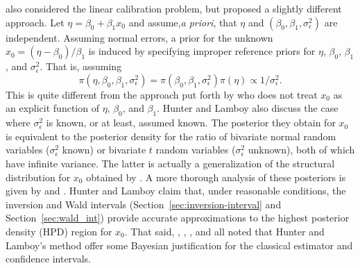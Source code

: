\documentclass[cmfont,usenames,dvipsnames,leqno]{afit-etd}\usepackage[]{graphicx}\usepackage[]{color}
\begin{document}
\citet{hunter_bayesian_1981} also considered the linear calibration problem, but proposed a slightly different approach. Let $\eta = \beta_0 + \beta_1 x_0$ and assume,\textit{a priori}, that $\eta$ and $(\beta_0, \beta_1, \sigma_\epsilon^2)$ are independent. Assuming normal errors, a prior for the unknown $x_0 = (\eta - \beta_0)/\beta_1$ is induced by specifying improper reference priors for $\eta$, $\beta_0$, $\beta_1$, and $\sigma_\epsilon^2$. That is, assuming 
\begin{equation*}
  \pi\left(\eta, \beta_0, \beta_1, \sigma_\epsilon^2\right) = \pi\left(\beta_0, \beta_1, \sigma_\epsilon^2\right) \pi\left(\eta\right) \propto 1/\sigma_\epsilon^2. 
\end{equation*}
This is quite different from the approach put forth by \citet{hoadley_bayesian_1970} who does not treat $x_0$ as an explicit function of $\eta$, $\beta_0$, and $\beta_1$. Hunter and Lamboy also discuss the case where $\sigma_\epsilon^2$ is known, or at least, assumed known. The posterior they obtain for $x_0$ is equivalent to the posterior density for the ratio of bivariate normal random variables ($\sigma_\epsilon^2$ known) or bivariate $t$ random variables ($\sigma_\epsilon^2$ unknown), both of which have infinite variance. The latter is actually a generalization of the structural distribution for $x_0$ obtained by \citet{kalotay_structural_1971}. A more thorough analysis of these posteriors is given by \citet{hunter_bayesian_1979} and \citet{hunter_making_1979}. Hunter and Lamboy claim that, under reasonable conditions, the inversion and Wald intervals (Section~\ref{sec:inversion-interval} and Section~\ref{sec:wald_int}) provide accurate approximations to the highest posterior density (HPD) region for $x_0$. That said, \citet{hill_discussion_1981}, \citet{orban_discussion_1981}, \citet{lwin_discussion_1981}, and \citet{brown_multivariate_1982} all noted that Hunter and Lamboy's method offer some Bayesian justification for the classical estimator and confidence intervals. 
\end{document}
